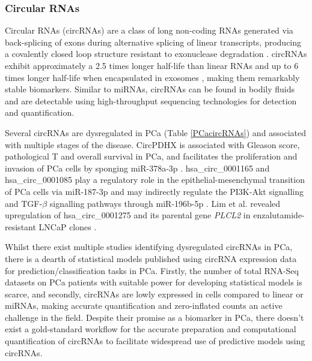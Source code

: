 \subsubsection{Circular RNAs}
Circular RNAs (circRNAs) are a class of long non-coding RNAs generated via back-splicing of exons during alternative splicing of linear transcripts, producing a covalently closed loop structure resistant to exonuclease degradation \cite{Salzman2012}. circRNAs exhibit approximately a 2.5 times longer half-life than linear RNAs and up to 6 times longer half-life when encapsulated in exosomes \cite{Li2015Aug}, making them remarkably stable biomarkers. Similar to miRNAs, circRNAs can be found in bodily fluids and are detectable using high-throughput sequencing technologies for detection and quantification. \par
Several circRNAs are dysregulated in PCa (Table \ref{PCacircRNAs}) and associated with multiple stages of the disease. CircPDHX is associated with Gleason score, pathological T and overall survival in PCa, and facilitates the proliferation and invasion of PCa cells by sponging miR-378a-3p \cite{Mao2021Jan}. hsa\_circ\_0001165 and hsa\_circ\_0001085 play a regulatory role in the epithelial-mesenchymal transition of PCa cells via miR-187-3p and may indirectly regulate the PI3K-Akt signalling and TGF-$\beta$ signalling pathways through miR-196b-5p \cite{Yan2020Feb}. Lim et al. revealed upregulation of hsa\_circ\_0001275 and its parental gene \textit{PLCL2} in enzalutamide-resistant LNCaP clones \cite{Lim2021Dec}. \par
Whilst there exist multiple studies identifying dysregulated circRNAs in PCa, there is a dearth of statistical models published using circRNA expression data for prediction/classification tasks in PCa. Firstly, the number of total RNA-Seq datasets on PCa patients with suitable power for developing statistical models is scarce, and secondly, circRNAs are lowly expressed in cells compared to linear or miRNAs, making accurate quantification and zero-inflated counts an active challenge in the field. Despite their promise as a biomarker in PCa, there doesn't exist a gold-standard workflow for the accurate preparation and computational quantification of circRNAs to facilitate widespread use of predictive models using circRNAs. 

